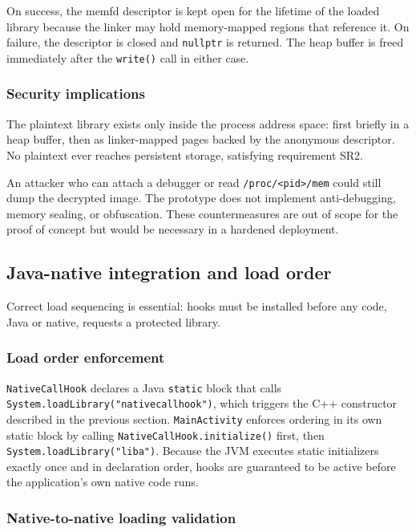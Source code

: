\documentclass[11pt,a4paper]{report}
\renewcommand\_{{\textunderscore\allowbreak}}
\begin{document}
On success, the memfd descriptor is kept open for the lifetime of the loaded library because the linker may hold memory-mapped regions that reference it.  On failure, the descriptor is closed and \texttt{nullptr} is returned.  The heap buffer is freed immediately after the \texttt{write()} call in either case.

\subsubsection{Security implications}
\label{sec:security_implications}

The plaintext library exists only inside the process address space: first briefly in a heap buffer, then as linker-mapped pages backed by the anonymous descriptor.  No plaintext ever reaches persistent storage, satisfying requirement SR2.

An attacker who can attach a debugger or read \texttt{/proc/<pid>/mem} could still dump the decrypted image.  The prototype does not implement anti-debugging, memory sealing, or obfuscation.  These countermeasures are out of scope for the proof of concept but would be necessary in a hardened deployment.

\subsection{Java-native integration and load order}

Correct load sequencing is essential: hooks must be installed before any code, Java or native, requests a protected library.

\subsubsection{Load order enforcement}

\texttt{NativeCallHook} declares a Java \texttt{static} block that calls \texttt{System.loadLibrary("nativecallhook")}, which triggers the C++ constructor described in the previous section.  \texttt{MainActivity} enforces ordering in its own static block by calling \texttt{NativeCallHook.\allowbreak initialize()} first, then \texttt{System.loadLibrary("liba")}.  Because the JVM executes static initializers exactly once and in declaration order, hooks are guaranteed to be active before the application's own native code runs.

\subsubsection{Native-to-native loading validation}
\end{document}
